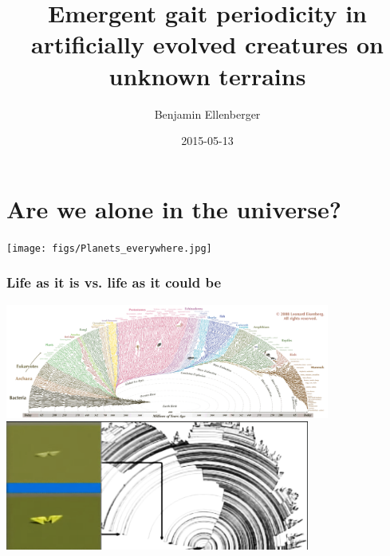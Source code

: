 \documentclass{beamer}
\author{Benjamin Ellenberger}
\institute{INI:  Institute of Neuroinformatics}
\title{Emergent gait periodicity in artificially evolved creatures on unknown terrains}
\date{2015-05-13}
\begin{document}
\titleframe

\section{Are we alone in the universe?}



\begin{minimalframe}
	\hspace*{-1.1cm}
	\vspace*{1cm}
	\texttt{[image: figs/Planets\_everywhere.jpg]}
	
\end{minimalframe}

\begin{frame}

	\frametitle{Life as it is vs. life as it could be}
	\begin{center}
	\includegraphics[width=0.8\textwidth,clip]{figs/tree_of_life_cut.png}\\\vspace{1em}
	\includegraphics[width=0.75\textwidth,clip]{figs/art_tree_of_life_cut.png}
	\end{center}

\end{frame}
\end{document}
